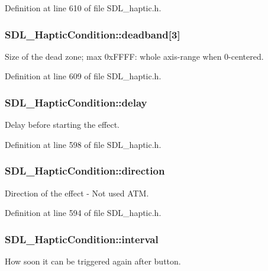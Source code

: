 Definition at line 610 of file S\-D\-L\-\_\-haptic.\-h.

\hypertarget{struct_s_d_l___haptic_condition_af684c8eeeb719739a32723c00c5a2bbd}{
\subsubsection[{deadband}]{ S\-D\-L\-\_\-\-Haptic\-Condition\-::deadband\mbox{[}3\mbox{]}}}\label{struct_s_d_l___haptic_condition_af684c8eeeb719739a32723c00c5a2bbd}
Size of the dead zone; max 0x\-F\-F\-F\-F\-: whole axis-\/range when 0-\/centered. 

Definition at line 609 of file S\-D\-L\-\_\-haptic.\-h.

\hypertarget{struct_s_d_l___haptic_condition_aad40417980530ca8d80c62ba864a090b}{
\subsubsection[{delay}]{ S\-D\-L\-\_\-\-Haptic\-Condition\-::delay}}\label{struct_s_d_l___haptic_condition_aad40417980530ca8d80c62ba864a090b}
Delay before starting the effect. 

Definition at line 598 of file S\-D\-L\-\_\-haptic.\-h.

\hypertarget{struct_s_d_l___haptic_condition_a728507d30d18998949313de3a25e5581}{
\subsubsection[{direction}]{ S\-D\-L\-\_\-\-Haptic\-Condition\-::direction}}\label{struct_s_d_l___haptic_condition_a728507d30d18998949313de3a25e5581}
Direction of the effect -\/ Not used A\-T\-M. 

Definition at line 594 of file S\-D\-L\-\_\-haptic.\-h.

\hypertarget{struct_s_d_l___haptic_condition_aafc182abea1078bed7e9cf5d0e713ea2}{
\subsubsection[{interval}]{ S\-D\-L\-\_\-\-Haptic\-Condition\-::interval}}\label{struct_s_d_l___haptic_condition_aafc182abea1078bed7e9cf5d0e713ea2}
How soon it can be triggered again after button. 

